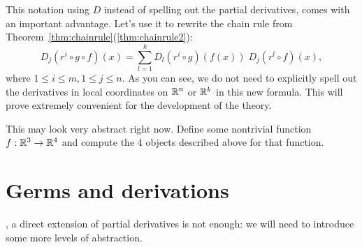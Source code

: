 This notation using $D$ instead of spelling out the partial derivatives, comes with an important advantage.
Let's use it to rewrite the chain rule from Theorem~\ref{thm:chainrule}(\ref{thm:chainrule2}):
\begin{equation}
	D_j(r^i\circ g \circ f) (x) = \sum_{l=1}^k D_l(r^i\circ g)(f(x))\; D_j(r^l \circ f)(x),
\end{equation}
where $1\leq i\leq m, 1\leq j \leq n$.
As you can see, we do not need to explicitly spell out the derivatives in local coordinates on $\mathbb{R}^n$ or $\mathbb{R}^k$ in this new formula.
This will prove extremely convenient for the development of the theory.

\begin{exercise}
	This may look very abstract right now.
	Define some nontrivial function $f: \mathbb{R}^3 \to \mathbb{R}^4$ and compute the 4 objects described above for that function.
\end{exercise}

\section{Germs and derivations}

, a direct extension of partial derivatives is not enough: we will need to introduce some more levels of abstraction.

